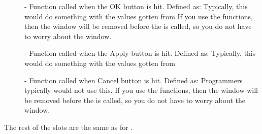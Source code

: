 \begin{description}
\item[]  - Function called when the OK button is hit.  Defined as:
Typically, this would do something with the values gotten from
If you use the  functions, then the window
will be removed before the  is called, so you do not
have to worry about the window.

\item[]  - Function called when the Apply button is hit.
Defined as:
Typically, this would do something with the values gotten from

\item[]  - Function called when Cancel button is hit.  Defined as:
Programmers typically would not use this.
If you use the  functions, then the window
will be removed before the  is called, so you do not
have to worry about the window.
\end{description}

The rest of the slots are the same as for .

